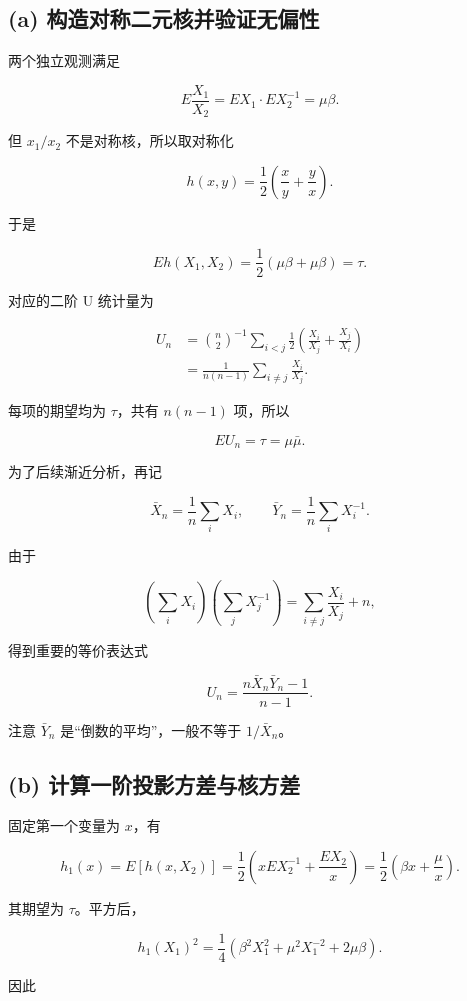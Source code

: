 \subsection{(a) 构造对称二元核并验证无偏性}

两个独立观测满足

\[
E\frac{X_1}{X_2}
=E X_1\cdot E X_2^{-1}
=\mu\beta.
\]

但 $x_1/x_2$ 不是对称核，所以取对称化

\[
\boxed{h(x,y)=\frac12\left(\frac{x}{y}+\frac{y}{x}\right)}.
\]

于是

\[
Eh(X_1,X_2)
=\frac12(\mu\beta+\mu\beta)=\tau.
\]

对应的二阶 U 统计量为

\[
\begin{aligned}
U_n
&=\binom n2^{-1}\sum_{i<j}
\frac12\left(\frac{X_i}{X_j}+\frac{X_j}{X_i}\right)\\
&=\boxed{\frac1{n(n-1)}\sum_{i\ne j}\frac{X_i}{X_j}}.
\end{aligned}
\]

每项的期望均为 $\tau$，共有 $n(n-1)$ 项，所以

\[
\boxed{EU_n=\tau=\mu\bar\mu.}
\]

为了后续渐近分析，再记

\[
\bar X_n=\frac1n\sum_iX_i,\qquad
\bar Y_n=\frac1n\sum_iX_i^{-1}.
\]

由于

\[
\left(\sum_iX_i\right)\left(\sum_jX_j^{-1}\right)
=\sum_{i\ne j}\frac{X_i}{X_j}+n,
\]

得到重要的等价表达式

\[
\boxed{U_n=\frac{n\bar X_n\bar Y_n-1}{n-1}.}
\tag{11.1}
\]

注意 $\bar Y_n$ 是“倒数的平均”，一般不等于 $1/\bar X_n$。

\subsection{(b) 计算一阶投影方差与核方差}

固定第一个变量为 $x$，有

\[
h_1(x)=E[h(x,X_2)]
=\frac12\left(xE X_2^{-1}+\frac{E X_2}{x}\right)
=\boxed{\frac12\left(\beta x+\frac{\mu}{x}\right)}.
\]

其期望为 $\tau$。平方后，

\[
h_1(X_1)^2
=\frac14\left(\beta^2X_1^2+\mu^2X_1^{-2}+2\mu\beta\right).
\]

因此

